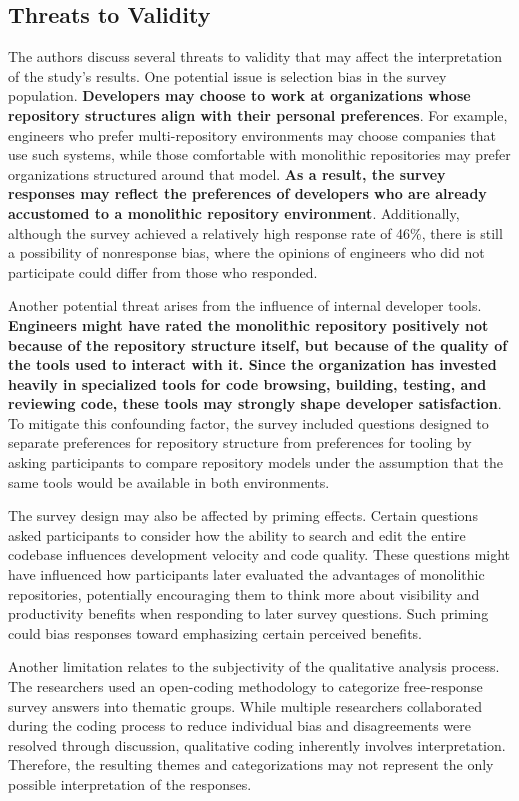 \subsection{Threats to Validity}
The authors discuss several threats to validity that may affect the interpretation of the study's results. One potential issue is selection bias in the survey population. \textbf{Developers may choose to work at organizations whose repository structures align with their personal preferences}. For example, engineers who prefer multi-repository environments may choose companies that use such systems, while those comfortable with monolithic repositories may prefer organizations structured around that model. \textbf{As a result, the survey responses may reflect the preferences of developers who are already accustomed to a monolithic repository environment}. Additionally, although the survey achieved a relatively high response rate of 46\%, there is still a possibility of nonresponse bias, where the opinions of engineers who did not participate could differ from those who responded.

Another potential threat arises from the influence of internal developer tools. \textbf{Engineers might have rated the monolithic repository positively not because of the repository structure itself, but because of the quality of the tools used to interact with it. Since the organization has invested heavily in specialized tools for code browsing, building, testing, and reviewing code, these tools may strongly shape developer satisfaction}. To mitigate this confounding factor, the survey included questions designed to separate preferences for repository structure from preferences for tooling by asking participants to compare repository models under the assumption that the same tools would be available in both environments.

The survey design may also be affected by priming effects. Certain questions asked participants to consider how the ability to search and edit the entire codebase influences development velocity and code quality. These questions might have influenced how participants later evaluated the advantages of monolithic repositories, potentially encouraging them to think more about visibility and productivity benefits when responding to later survey questions. Such priming could bias responses toward emphasizing certain perceived benefits.

Another limitation relates to the subjectivity of the qualitative analysis process. The researchers used an open-coding methodology to categorize free-response survey answers into thematic groups. While multiple researchers collaborated during the coding process to reduce individual bias and disagreements were resolved through discussion, qualitative coding inherently involves interpretation. Therefore, the resulting themes and categorizations may not represent the only possible interpretation of the responses.

